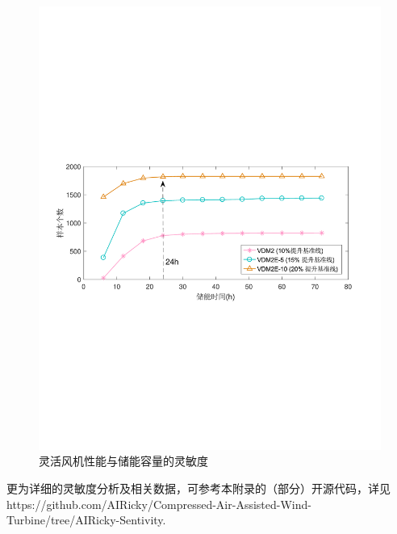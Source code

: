 \begin{figure}[H] %
  \centering
  \includegraphics[scale=0.65]{figures/Chap5-CA-WT-Storage-Time-Sensitivity.pdf}
  \caption{灵活风机性能与储能容量的灵敏度}
  \label{fig:CA-WT-Storage-Time-Sensitivity}
\end{figure}

更为详细的灵敏度分析及相关数据，可参考本附录的（部分）开源代码，详见 https://github.com/AIRicky/Compressed-Air-Assisted-Wind-Turbine/tree/AIRicky-Sentivity.
